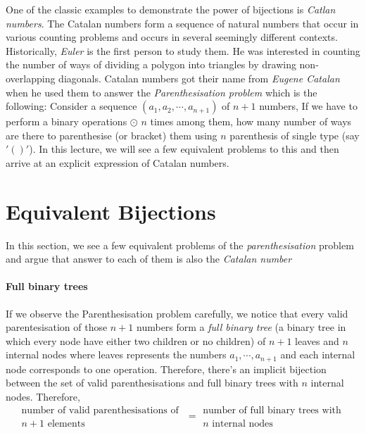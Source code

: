 
One of the classic examples to demonstrate the power of bijections is \emph{Catlan numbers}. The Catalan numbers form a sequence of natural numbers that occur in various counting problems and occurs in several seemingly different contexts. Historically, \emph{Euler} is the first person to study them. He was interested in counting the number of ways of dividing a polygon into triangles by drawing non-overlapping diagonals. Catalan numbers got their name from \emph{Eugene Catalan} when he used them to answer the \emph{Parenthesisation problem} which is the following: Consider a sequence $(a_1,a_2,\cdots,a_{n+1})$ of $n+1$ numbers, If we have to perform a binary operations $\odot$ $n$ times among them, how many number of ways are there to parenthesise (or bracket) them using $n$ parenthesis of single type (say $'()'$). In this lecture, we will see a few equivalent problems to this and then arrive at an explicit expression of Catalan numbers.
\section{Equivalent Bijections}
In this section, we see a few equivalent problems of the \emph{parenthesisation} problem and argue that answer to each of them is also the \emph{Catalan number}
\paragraph{Full binary trees} If we observe the Parenthesisation problem carefully, we notice that every valid parentesisation of those $n+1$ numbers form a \emph{full binary tree} (a binary tree in which every node have either two children or no children) of $n+1$ leaves and $n$ internal nodes where leaves represents the numbers $a_1,\cdots,a_{n+1}$ and each internal node corresponds to one operation. Therefore, there's an implicit bijection between the set of valid parenthesisations and full binary trees with $n$ internal nodes. Therefore, 
\begin{equation}
    \substack{\textrm{number of valid parenthesisations of }\\ n+1 \textrm{ elements }}  = \substack{\textrm{number of full binary trees with }\\ n \textrm{ internal nodes}}
\end{equation}  


